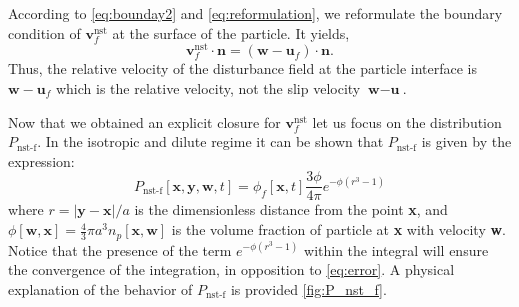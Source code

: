According to \ref{eq:bounday2} and \ref{eq:reformulation}, we reformulate the boundary condition of $\textbf{v}^\text{nst}_f$ at the surface of the particle. 
It yields, 
\begin{equation*}
    \textbf{v}^\text{nst}_f\cdot \textbf{n}
    = \left(
        \textbf{w} - \textbf{u}_f
    \right)\cdot \textbf{n}.
\end{equation*}
Thus, the relative velocity of the disturbance field  at the particle interface is $\textbf{w} - \textbf{u}_f$ which is the relative velocity, not the slip velocity $\textbf{w} - \textbf{u}$. 

Now that we obtained an explicit closure for $\textbf{v}^\text{nst}_f$ let us focus 
on the distribution $P_\text{nst-f}$. 
In the isotropic and dilute regime it can be shown that $P_\text{nst-f}$ is given by the expression\citep{zhang2021ensemble}: 
\begin{equation}
    P_\text{nst-f}[\textbf{x},\textbf{y},\textbf{w},t]
    = \phi_f[\textbf{x},t] \frac{3\phi}{4\pi} e^{-\phi(r^3 -1)}
    \label{eq:Pnst_explicit}
\end{equation} 
where $r = |\textbf{y} - \textbf{x}|/a$ is the dimensionless distance from the point \textbf{x},  and $\phi[\textbf{w},\textbf{x}] = \frac{4}{3}\pi a^3 n_p[\textbf{x},\textbf{w}]$ is the volume fraction of particle at \textbf{x} with velocity \textbf{w}. 
Notice that the presence of the term $e^{-\phi(r^3 -1)}$ within the integral will ensure the convergence of the integration, in opposition to \ref{eq:error}. 
A physical explanation of the behavior of $P_\text{nst-f}$ is provided \ref{fig:P_nst_f}. 
